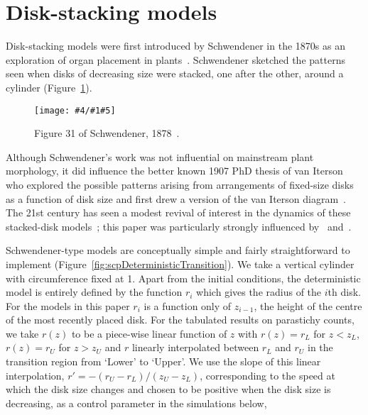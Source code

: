 \documentclass[a4paper,10pt]{amsart}
\newlength{\jfigwidth}
\newcommand{\jpgfig}[3]{\jdofig{#1}{#2}{#3}{Figures}{.jpg}}
\newcommand{\jdofig}[5]{
	\begin{figure}\centering\texttt{[image: \#4/\#1\#5]} \caption{#2}\label{fig:#1}\end{figure}
}
\begin{document}
\section{Disk-stacking models}



 Disk-stacking models were first introduced by Schwendener in the 1870s as an exploration of organ placement in plants~\cite{schwendenerMechanischeTheorieBlattstellungen1878}.  Schwendener sketched the patterns seen when disks of decreasing size were stacked, one after the other, around a cylinder (Figure~\ref{fig:schwendener1878}).%
\jpgfig{schwendener1878}{Figure 31 of Schwendener, 1878~\cite{schwendenerMechanischeTheorieBlattstellungen1878}. 
}{.6}
%
Although Schwendener's work was not influential on mainstream plant morphology, it did influence the better known 1907 PhD thesis of van Iterson who explored the possible patterns arising from arrangements of fixed-size disks as a function of disk size and first drew a version of the van Iterson diagram~\cite{vanitersonjrMathematischeUndMikroscopischAnatomische1907,	schouteUberPseudokonchoiden1913}.
 The 21st century has seen a modest revival of interest in the dynamics of these stacked-disk models~\cite{
	atelaRhombicTilingsPrimordia2017,
	hottonPossibleActualPhyllotaxis2006,
	atelaGeometricDynamicEssence2011};  this paper was particularly strongly influenced by~\cite{goleFibonacciQuasisymmetricPhyllotaxis2016} and~\cite{goleConvergenceDiskStacking2020}. 	

Schwendener-type models are conceptually simple and fairly straightforward to implement (Figure~\ref{fig:scpDeterministicTransition}).
 We take a vertical cylinder with circumference fixed at 1. Apart from the initial conditions, the deterministic model is entirely defined by the function $r_i$ which gives the radius of the $i$th disk. For the models in this paper $r_i$ is a function only of $z_{i-1}$, the height of the centre of the most recently placed disk.
 For the tabulated results on parastichy counts, we take  $r(z)$ to be a piece-wise linear function of $z$ with $r(z)=r_L$ for $z<z_L$, $r(z)=r_U$ for $z>z_U$ and $r$ linearly interpolated between $r_L$ and  $r_U$ in the transition region from `Lower' to `Upper'. We use the slope of this linear interpolation, $r'= -(r_U-r_L)/(z_U-z_L)$, corresponding to the speed at which the disk size changes and chosen to be positive when the disk size is decreasing, as a control parameter in the simulations below, 
\end{document}
